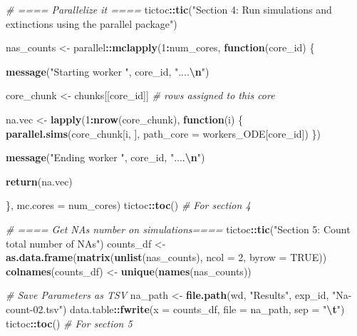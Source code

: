 \documentclass[
]{article}
\newenvironment{Shaded}{\begin{snugshade}}{\end{snugshade}}
\newcommand{\AttributeTok}[1]{\textcolor[rgb]{0.13,0.29,0.53}{#1}}
\newcommand{\CommentTok}[1]{\textcolor[rgb]{0.56,0.35,0.01}{\textit{#1}}}
\newcommand{\ConstantTok}[1]{\textcolor[rgb]{0.56,0.35,0.01}{#1}}
\newcommand{\ControlFlowTok}[1]{\textcolor[rgb]{0.13,0.29,0.53}{\textbf{#1}}}
\newcommand{\DecValTok}[1]{\textcolor[rgb]{0.00,0.00,0.81}{#1}}
\newcommand{\FunctionTok}[1]{\textcolor[rgb]{0.13,0.29,0.53}{\textbf{#1}}}
\newcommand{\NormalTok}[1]{#1}
\newcommand{\OtherTok}[1]{\textcolor[rgb]{0.56,0.35,0.01}{#1}}
\newcommand{\SpecialCharTok}[1]{\textcolor[rgb]{0.81,0.36,0.00}{\textbf{#1}}}
\newcommand{\StringTok}[1]{\textcolor[rgb]{0.31,0.60,0.02}{#1}}
\begin{document}
\begin{Shaded}
\begin{Highlighting}[]
\CommentTok{\# ==== Parallelize it ====}
\NormalTok{tictoc}\SpecialCharTok{::}\FunctionTok{tic}\NormalTok{(}\StringTok{"Section 4: Run simulations and extinctions using the parallel package"}\NormalTok{)}

\NormalTok{nas\_counts }\OtherTok{\textless{}{-}}\NormalTok{ parallel}\SpecialCharTok{::}\FunctionTok{mclapply}\NormalTok{(}\DecValTok{1}\SpecialCharTok{:}\NormalTok{num\_cores, }\ControlFlowTok{function}\NormalTok{(core\_id) \{}
  
  \FunctionTok{message}\NormalTok{(}\StringTok{"Starting worker "}\NormalTok{, core\_id, }\StringTok{"....}\SpecialCharTok{\textbackslash{}n}\StringTok{"}\NormalTok{)}
  
\NormalTok{  core\_chunk }\OtherTok{\textless{}{-}}\NormalTok{ chunks[[core\_id]]  }\CommentTok{\# rows assigned to this core}
  
\NormalTok{  na.vec }\OtherTok{\textless{}{-}} \FunctionTok{lapply}\NormalTok{(}\DecValTok{1}\SpecialCharTok{:}\FunctionTok{nrow}\NormalTok{(core\_chunk), }\ControlFlowTok{function}\NormalTok{(i) \{}
    \FunctionTok{parallel.sims}\NormalTok{(core\_chunk[i, ], }\AttributeTok{path\_core =}\NormalTok{ workers\_ODE[core\_id])}
\NormalTok{  \})}
  
  \FunctionTok{message}\NormalTok{(}\StringTok{"Ending worker "}\NormalTok{, core\_id, }\StringTok{"....}\SpecialCharTok{\textbackslash{}n}\StringTok{"}\NormalTok{)}
  
  \FunctionTok{return}\NormalTok{(na.vec)}
  
\NormalTok{\}, }\AttributeTok{mc.cores =}\NormalTok{ num\_cores)}
\NormalTok{tictoc}\SpecialCharTok{::}\FunctionTok{toc}\NormalTok{() }\CommentTok{\# For section 4}


\CommentTok{\# ==== Get NAs number on simulations====}
\NormalTok{tictoc}\SpecialCharTok{::}\FunctionTok{tic}\NormalTok{(}\StringTok{"Section 5: Count total number of NAs"}\NormalTok{)}
\NormalTok{counts\_df }\OtherTok{\textless{}{-}} \FunctionTok{as.data.frame}\NormalTok{(}\FunctionTok{matrix}\NormalTok{(}\FunctionTok{unlist}\NormalTok{(nas\_counts), }\AttributeTok{ncol =} \DecValTok{2}\NormalTok{, }\AttributeTok{byrow =} \ConstantTok{TRUE}\NormalTok{))}
\FunctionTok{colnames}\NormalTok{(counts\_df) }\OtherTok{\textless{}{-}} \FunctionTok{unique}\NormalTok{(}\FunctionTok{names}\NormalTok{(nas\_counts))}

\CommentTok{\# Save Parameters as TSV}
\NormalTok{na\_path }\OtherTok{\textless{}{-}} \FunctionTok{file.path}\NormalTok{(wd, }\StringTok{"Results"}\NormalTok{, exp\_id, }\StringTok{"Na{-}count{-}02.tsv"}\NormalTok{)}
\NormalTok{data.table}\SpecialCharTok{::}\FunctionTok{fwrite}\NormalTok{(}\AttributeTok{x =}\NormalTok{ counts\_df, }\AttributeTok{file =}\NormalTok{ na\_path, }\AttributeTok{sep =} \StringTok{"}\SpecialCharTok{\textbackslash{}t}\StringTok{"}\NormalTok{)}
\NormalTok{tictoc}\SpecialCharTok{::}\FunctionTok{toc}\NormalTok{() }\CommentTok{\# For section 5}
\end{Highlighting}
\end{Shaded}
\end{document}
